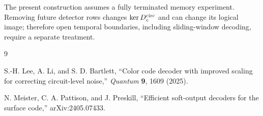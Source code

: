 \documentclass[10pt,twocolumn]{article}
\begin{document}
The present construction assumes a fully terminated memory experiment.
Removing future detector rows changes \(\ker D_c^{\rm circ}\) and can change
its logical image; therefore open temporal boundaries, including
sliding-window decoding, require a separate treatment.

\begin{thebibliography}{9}

S.-H. Lee, A. Li, and S. D. Bartlett,
``Color code decoder with improved scaling for correcting circuit-level
noise,'' \emph{Quantum} \textbf{9}, 1609 (2025).

N. Meister, C. A. Pattison, and J. Preskill,
``Efficient soft-output decoders for the surface code,''
arXiv:2405.07433.

\end{thebibliography}
\end{document}
